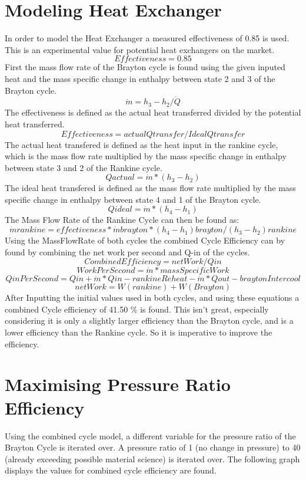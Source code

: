 \documentclass{article}
\begin{document}
\section{Modeling Heat Exchanger}
In order to model the Heat Exchanger a measured effectiveness of 0.85 is used. This is an experimental value for potential heat exchangers on the market.
    \[Effectiveness = 0.85\]
First the mass flow rate of the Brayton cycle is found using the given inputed heat and the mass specific change in enthalpy between state 2 and 3 of the Brayton cycle.
    \[\dot{m} = h_3 - h_2 / \dot{Q}\]
The effectiveness is defined as the actual heat transferred divided by the potential heat transferred.
   \[Effectiveness = actual Q transfer/ Ideal Q transfer\]
The actual heat transfered is defined as the heat input in the rankine cycle, which is the mass flow rate multiplied by the mass specific change in enthalpy between state 3 and 2 of the Rankine cycle.
   \[Qactual = \dot{m} * (h_3 - h_2)\]
The ideal heat transfered is defined as the mass flow rate multiplied by the mass specific change in enthalpy between state 4 and 1 of the Brayton cycle.
    \[Qideal = \dot{m} * (h_4 - h_1)\]
The Mass Flow Rate of the Rankine Cycle can then be found as:
    \[\dot{m}rankine = effectiveness * \dot{m}brayton * (h_4 - h_1)brayton / (h_3 - h_2)rankine\]
Using the MassFlowRate of both cycles the combined Cycle Efficiency can by found by combining the net work per second and Q-in of the cycles.
    \[CombinedEfficiency = netWork/Qin\]
    \[WorkPerSecond = \dot{m} * massSpecificWork\]
    \[QinPerSecond = Qin + \dot{m} * Qin-rankineReheat - \dot{m} * Qout-braytonIntercool\]
    \[netWork = W(rankine) + W(Brayton)\]
After Inputting the initial values used in both cycles, and using these equations a combined Cycle efficiency of 41.50 \% is found. This isn't great, especially considering it is only a slightly larger efficiency than the Brayton cycle, and is a lower efficiency than the Rankine cycle. So it is imperative to improve the efficiency.

\section{Maximising Pressure Ratio Efficiency}
Using the combined cycle model, a different variable for the pressure ratio of the Brayton Cycle is iterated over. A pressure ratio of 1 (no change in pressure) to 40 (already exceeding possible material science) is iterated over. The following graph displays the values for combined cycle efficiency are found.
\end{document}
